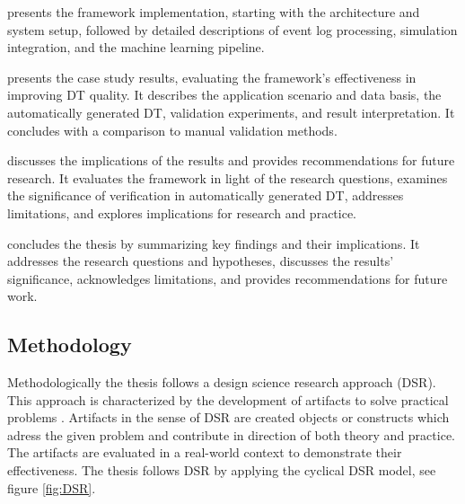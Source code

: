  presents the framework implementation, starting with the architecture and system setup, followed by detailed descriptions of event log processing, simulation integration, and the machine learning pipeline.

 presents the case study results, evaluating the framework's effectiveness in improving DT quality. It describes the application scenario and data basis, the automatically generated DT, validation experiments, and result interpretation. It concludes with a comparison to manual validation methods.

 discusses the implications of the results and provides recommendations for future research. It evaluates the framework in light of the research questions, examines the significance of verification in automatically generated DT, addresses limitations, and explores implications for research and practice.

 concludes the thesis by summarizing key findings and their implications. It addresses the research questions and hypotheses, discusses the results' significance, acknowledges limitations, and provides recommendations for future work.

\subsection{Methodology}

Methodologically the thesis follows a design science research approach (DSR). This approach is characterized by the development of artifacts to solve practical problems \parencite{hevner2004design,peffers2007design}. Artifacts in the sense of DSR are created objects or constructs which adress the given problem and contribute in direction of both theory and practice. The artifacts are evaluated in a real-world context to demonstrate their effectiveness. The thesis follows DSR by applying the cyclical DSR model, see figure \ref{fig:DSR}.


